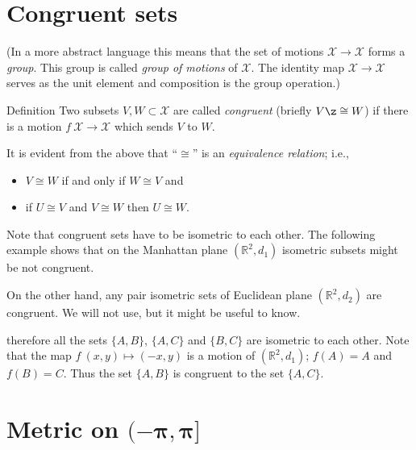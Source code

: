 \section*{Congruent sets}



(In a more abstract language this means that  the set of motions $\mathcal X\to\mathcal X$ forms a {}\emph{group}.
This group is called \emph{group of motions} of $\mathcal X$.
The identity map $\mathcal X\to\mathcal X$ serves as the unit element  and composition is the group operation.)

\begin{thm}{Definition}
Two subsets $V,W\subset \mathcal X$ are called \emph{congruent} (briefly \index{$\cong$}$V\z\cong W$)
if there is a motion $f\:\mathcal X\to\mathcal X$ which sends $V$ to $W$.
\end{thm}

It is evident from the above that ``$\cong$'' is an  \emph{equivalence relation};
i.e., 
\begin{itemize}
\item $V\cong W$ if and only if $W\cong V$ and 
\item if $U\cong V$ and $V\cong W$ then $U\cong W$.
\end{itemize}


Note that congruent sets have to be isometric to each other.
The following example shows that on the Manhattan plane $(\mathbb{R}^2,d_1)$ isometric subsets might be not congruent.

On the other hand,
any pair isometric sets of Euclidean plane $(\mathbb{R}^2,d_2)$ are congruent.
We will not use, but it might be useful to know.



therefore all the sets $\{A,B\}$, $\{A,C\}$ and $\{B,C\}$ are isometric to each other.
Note that the map $f\:(x,y)\mapsto (-x,y)$ is a motion of $(\mathbb{R}^2,d_1)$; 
$f(A)=A$ and $f(B)=C$.
Thus the set $\{A,B\}$ is congruent to the set $\{A,C\}$.









\section*{Metric on $\bm{(-\pi,\pi]}$}
\addtocontents{toc}{Metric on $(-\pi,\pi]$.}

